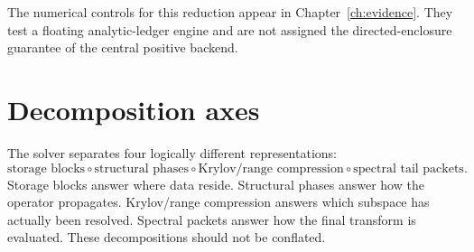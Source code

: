 The numerical controls for this reduction appear in
Chapter~\ref{ch:evidence}. They test a floating analytic-ledger engine and
are not assigned the directed-enclosure guarantee of the central positive
backend.

\section{Decomposition axes}

The solver separates four logically different representations:
\[
\boxed{
\text{storage blocks}
\circ
\text{structural phases}
\circ
\text{Krylov/range compression}
\circ
\text{spectral tail packets}.
}
\]
Storage blocks answer where data reside.  Structural phases answer how the
operator propagates.  Krylov/range compression answers which subspace has
actually been resolved.  Spectral packets answer how the final transform is
evaluated.  These decompositions should not be conflated.



